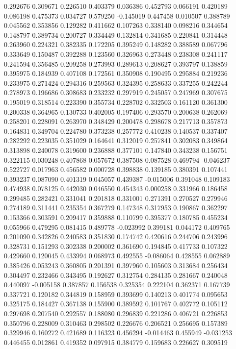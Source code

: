 0.292676
0.309671
0.226510
0.403379
0.036386
0.452793
0.066191
0.420189
0.086198
0.475373
0.034727
0.579250
-0.145019
0.447458
0.010507
0.388789
0.045562
0.353856
0.129282
0.411662
0.107263
0.338140
0.098216
0.344654
0.148797
0.389734
0.200727
0.334449
0.132814
0.341685
0.220841
0.314448
0.263960
0.224321
0.382335
0.172205
0.395249
0.148282
0.388589
0.067796
0.333649
0.150487
0.392288
0.123560
0.326963
0.273448
0.238308
0.241117
0.241594
0.356485
0.209258
0.273993
0.289613
0.208627
0.393797
0.138859
0.395975
0.184939
0.407108
0.172561
0.350908
0.190495
0.295884
0.219236
0.233975
0.271424
0.294316
0.259563
0.324395
0.258633
0.337255
0.242244
0.278973
0.196686
0.308683
0.233232
0.297919
0.245057
0.247969
0.307675
0.195019
0.318514
0.223390
0.355734
0.228702
0.332503
0.161120
0.361300
0.200338
0.364965
0.130733
0.402005
0.197406
0.293570
0.200638
0.262069
0.258201
0.228091
0.263970
0.348429
0.200478
0.298678
0.217713
0.357873
0.164831
0.349704
0.224780
0.373238
0.257772
0.410238
0.140537
0.337407
0.282292
0.223035
0.351029
0.164641
0.312019
0.257841
0.302083
0.349864
0.313898
0.240078
0.319600
0.236888
0.377101
0.147840
0.343238
0.156751
0.322115
0.030248
0.407868
0.057672
0.387508
0.087528
0.469794
-0.046237
0.522727
0.017963
0.456582
0.000728
0.398838
0.139185
0.380391
0.107441
0.393237
0.087090
0.401319
0.045057
0.439387
-0.015006
0.391048
0.109183
0.474938
0.078125
0.442030
0.046550
0.454343
0.000258
0.331966
0.186458
0.299485
0.282421
0.331041
0.201818
0.331001
0.271391
0.270527
0.279946
0.274189
0.311441
0.235354
0.367279
0.147348
0.317953
0.190867
0.362297
0.153366
0.303591
0.209417
0.359888
0.110799
0.395377
0.180785
0.455234
0.055966
0.479295
0.081415
0.489778
-0.023992
0.399181
0.044172
0.409765
0.201090
0.342826
0.240583
0.351830
0.174742
0.420616
0.244706
0.243996
0.328731
0.151293
0.302338
0.200002
0.361690
0.194845
0.417733
0.107322
0.429660
0.120045
0.433994
0.068973
0.492555
-0.086064
0.428555
0.062889
0.385426
0.053243
0.360805
0.201391
0.397960
0.105603
0.313684
0.256434
0.304497
0.232466
0.343495
0.192627
0.312754
0.284135
0.281667
0.240048
0.440097
-0.005158
0.387857
0.156538
0.325354
0.222104
0.362371
0.167739
0.337721
0.120182
0.344819
0.158959
0.393699
0.140213
0.401774
0.095653
0.325175
0.184427
0.367138
0.155900
0.389592
0.101767
0.402772
0.105112
0.297698
0.207540
0.292557
0.188080
0.296839
0.221286
0.406721
0.226853
0.350796
0.228009
0.310463
0.298502
0.226676
0.206521
0.256695
0.157389
0.329946
0.160272
0.421689
0.116323
0.456294
-0.014463
0.455949
-0.031253
0.446455
0.012861
0.419352
0.097915
0.384779
0.159683
0.226627
0.309519
